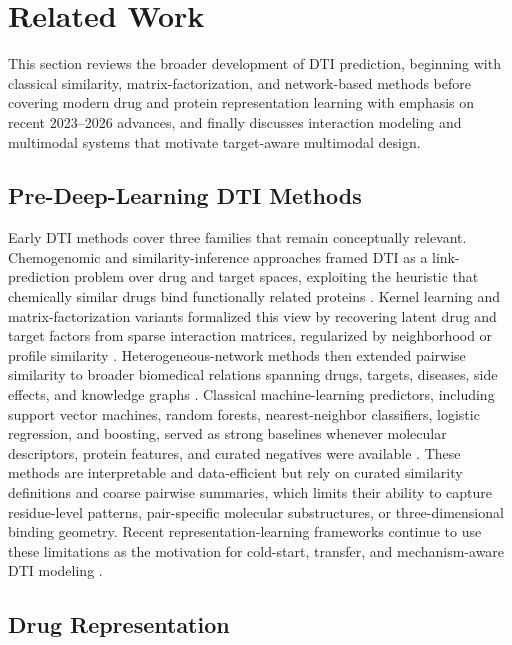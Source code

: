 \section{Related Work}
\label{sec:related_work}

This section reviews the broader development of DTI prediction, beginning with classical similarity,
matrix-factorization, and network-based methods before covering modern drug and protein representation
learning with emphasis on recent 2023--2026 advances, and finally discusses interaction modeling and
multimodal systems that motivate target-aware multimodal design.

\subsection{Pre-Deep-Learning DTI Methods}

Early DTI methods cover three families that remain conceptually relevant. Chemogenomic and
similarity-inference approaches framed DTI as a link-prediction problem over drug and target spaces,
exploiting the heuristic that chemically similar drugs bind functionally related proteins
\citep{yamanishi2008prediction,keiser2007relating}. Kernel learning and matrix-factorization variants
formalized this view by recovering latent drug and target factors from sparse interaction matrices,
regularized by neighborhood or profile similarity \citep{liu2016nrlmf,he2017simboost}. Heterogeneous-network
methods then extended pairwise similarity to broader biomedical relations spanning drugs, targets,
diseases, side effects, and knowledge graphs \citep{luo2017dtinet,wan2019neodti,ye2021kgenfm}. Classical
machine-learning predictors, including support vector machines, random forests, nearest-neighbor
classifiers, logistic regression, and boosting, served as strong baselines whenever molecular descriptors,
protein features, and curated negatives were available
\citep{cortes1995svm,breiman2001random,guo2003knn,friedman2000logistic,liu2015credible}. These methods
are interpretable and data-efficient but rely on curated similarity definitions and coarse pairwise
summaries, which limits their ability to capture residue-level patterns, pair-specific molecular
substructures, or three-dimensional binding geometry. Recent representation-learning frameworks continue
to use these limitations as the motivation for cold-start, transfer, and mechanism-aware DTI modeling
\citep{luo2024druglamp,lu2025dtiam}.

\subsection{Drug Representation}

